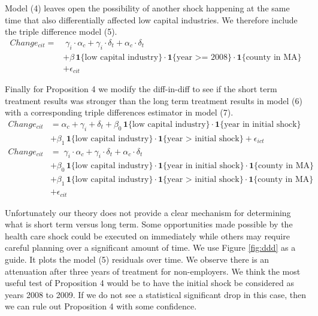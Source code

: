 \documentclass[12pt]{article}
\begin{document}
Model (4) leaves open the possibility of another shock happening at the same time that also differentially affected low capital industries. We therefore include the triple difference model (5). 
\begin{align}
Change_{cit} = & \; \gamma_i \cdot \alpha_c + \gamma_i \cdot \delta_t +  \alpha_c \cdot \delta_t \nonumber   \\
& + \beta \, \mathbf{1}\{\text{low capital industry}\} \cdot \mathbf{1}\{\text{year >= 2008}\}  \cdot \mathbf{1}\{\text{county in MA}\} \nonumber  \\
& + \epsilon_{cit}
\end{align}

Finally for Proposition 4 we modify the diff-in-diff to see if the short term treatment results was stronger than the long term treatment results in model (6) with a corresponding triple differences estimator in model (7). 
\begin{align}
Change_{cit} & =  \alpha_c + \gamma_i+ \delta_t  \nonumber + \beta_{0} \, \mathbf{1}\{\text{low capital industry}\} \cdot \mathbf{1}\{\text{year in initial shock}\} \nonumber \\
& + \beta_{1} \, \mathbf{1}\{\text{low capital industry}\} \cdot \mathbf{1}\{\text{year > initial shock}\} + \epsilon_{ict} \\
Change_{cit} & =  \; \gamma_i \cdot \alpha_c + \gamma_i \cdot \delta_t +  \alpha_c \cdot \delta_t \nonumber   \\
& + \beta_{0} \, \mathbf{1}\{\text{low capital industry}\} \cdot \mathbf{1}\{\text{year in initial shock}\}  \cdot \mathbf{1}\{\text{county in MA}\} \nonumber  \\
& + \beta_{1} \, \mathbf{1}\{\text{low capital industry}\} \cdot \mathbf{1}\{\text{year > initial shock}\}  \cdot \mathbf{1}\{\text{county in MA}\} \nonumber  \\
& + \epsilon_{cit}
\end{align}

Unfortunately our theory does not provide a clear mechanism for determining what is short term versus long term. Some opportunities made possible by the health care shock could be executed on immediately while others may require careful planning over a significant amount of time. We use Figure \ref{fig:ddd} as a guide. It plots the model (5) residuals over time. We observe there is an attenuation after three years of treatment for non-employers. We think the most useful test of Proposition 4 would be to have the initial shock be considered as years 2008 to 2009. If we do not see a statistical significant drop in this case, then we can rule out Proposition 4 with some confidence. 
\end{document}
